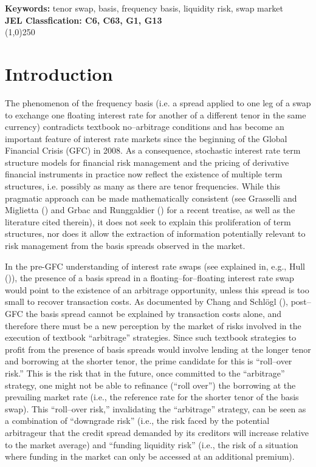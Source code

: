 \documentclass[12pt,a4paper]{article}
\theoremstyle{plain}
\numberwithin{equation}{section}
\begin{document}
\textbf{Keywords:} tenor swap,  basis, frequency basis, liquidity risk, swap market \\
\textbf{JEL Classfication: C6, C63, G1, G13} \\
\line(1,0){250}\\[1em]
\section{Introduction}
The phenomenon of the frequency basis (i.e. a spread applied to one leg of a swap to exchange one floating interest rate for another of a different tenor in the same currency) contradicts textbook no--arbitrage conditions and has become an important feature of interest rate markets since the beginning of the Global Financial Crisis (GFC) in 2008. As a consequence, stochastic interest rate term structure models for financial risk management and the pricing of derivative financial instruments in practice now reflect the existence of multiple term structures, i.e. possibly as many as there are tenor frequencies. While this pragmatic approach can be made mathematically consistent (see Grasselli and Miglietta (\citeyear*{GM15}) and Grbac and Runggaldier (\citeyear*{GrbRung:2015}) for a recent treatise, as well as the literature cited therein), it does not seek to explain this proliferation of term structures, nor does it allow the extraction of information potentially relevant to risk management from the basis spreads observed in the market.

In the pre-GFC understanding of interest rate swaps (see explained in, e.g., Hull (\citeyear*{Hull2008})), the presence of a basis spread in a floating--for--floating interest rate swap would point to the existence of an arbitrage opportunity, unless this spread is too small to recover transaction costs. As documented by Chang and Schl\"ogl (\citeyear*{ChaSch:2015}), post--GFC the basis spread cannot be explained by transaction costs alone, and therefore there must be a new perception by the market of risks involved in the execution of textbook ``arbitrage'' strategies. Since such textbook strategies to profit from the presence of basis spreads would involve lending at the longer tenor and borrowing at the shorter tenor, the prime candidate for this is ``roll--over risk.'' This is the risk that in the future, once committed to the ``arbitrage'' strategy, one might not be able to refinance (``roll over'') the borrowing at the prevailing market rate (i.e., the reference rate for the shorter tenor of the basis swap). This ``roll--over risk,'' invalidating the ``arbitrage'' strategy, can be seen as a combination of ``downgrade risk'' (i.e., the risk faced by the potential arbitrageur that the credit spread demanded by its creditors will increase relative to the market average) and ``funding liquidity risk'' (i.e., the risk of a situation where funding in the market can only be accessed at an additional premium).
\end{document}

